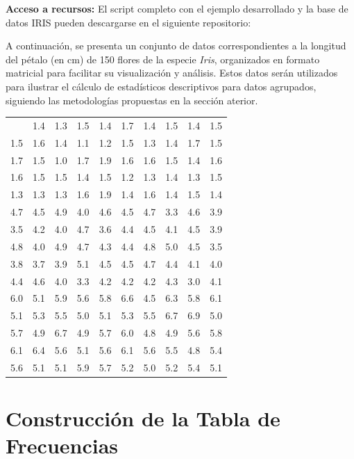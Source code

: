 \documentclass[
  spanish,
  letterpaper,
]{book}
\begin{document}
\textbf{Acceso a recursos:} El script completo con el ejemplo
desarrollado y la base de datos IRIS pueden descargarse en el siguiente
repositorio:

A continuación, se presenta un conjunto de datos correspondientes a la
longitud del pétalo (en cm) de 150 flores de la especie \emph{Iris},
organizados en formato matricial para facilitar su visualización y
análisis. Estos datos serán utilizados para ilustrar el cálculo de
estadísticos descriptivos para datos agrupados, siguiendo las
metodologías propuestas en la sección aterior.

\begin{longtable}[]{@{}llllllllll@{}}
\toprule\noalign{}
\endhead
\bottomrule\noalign{}
\endlastfoot
1.4 & 1.4 & 1.3 & 1.5 & 1.4 & 1.7 & 1.4 & 1.5 & 1.4 & 1.5 \\
1.5 & 1.6 & 1.4 & 1.1 & 1.2 & 1.5 & 1.3 & 1.4 & 1.7 & 1.5 \\
1.7 & 1.5 & 1.0 & 1.7 & 1.9 & 1.6 & 1.6 & 1.5 & 1.4 & 1.6 \\
1.6 & 1.5 & 1.5 & 1.4 & 1.5 & 1.2 & 1.3 & 1.4 & 1.3 & 1.5 \\
1.3 & 1.3 & 1.3 & 1.6 & 1.9 & 1.4 & 1.6 & 1.4 & 1.5 & 1.4 \\
4.7 & 4.5 & 4.9 & 4.0 & 4.6 & 4.5 & 4.7 & 3.3 & 4.6 & 3.9 \\
3.5 & 4.2 & 4.0 & 4.7 & 3.6 & 4.4 & 4.5 & 4.1 & 4.5 & 3.9 \\
4.8 & 4.0 & 4.9 & 4.7 & 4.3 & 4.4 & 4.8 & 5.0 & 4.5 & 3.5 \\
3.8 & 3.7 & 3.9 & 5.1 & 4.5 & 4.5 & 4.7 & 4.4 & 4.1 & 4.0 \\
4.4 & 4.6 & 4.0 & 3.3 & 4.2 & 4.2 & 4.2 & 4.3 & 3.0 & 4.1 \\
6.0 & 5.1 & 5.9 & 5.6 & 5.8 & 6.6 & 4.5 & 6.3 & 5.8 & 6.1 \\
5.1 & 5.3 & 5.5 & 5.0 & 5.1 & 5.3 & 5.5 & 6.7 & 6.9 & 5.0 \\
5.7 & 4.9 & 6.7 & 4.9 & 5.7 & 6.0 & 4.8 & 4.9 & 5.6 & 5.8 \\
6.1 & 6.4 & 5.6 & 5.1 & 5.6 & 6.1 & 5.6 & 5.5 & 4.8 & 5.4 \\
5.6 & 5.1 & 5.1 & 5.9 & 5.7 & 5.2 & 5.0 & 5.2 & 5.4 & 5.1 \\
\end{longtable}

\section{Construcción de la Tabla de
Frecuencias}\label{construcciuxf3n-de-la-tabla-de-frecuencias}
\end{document}
